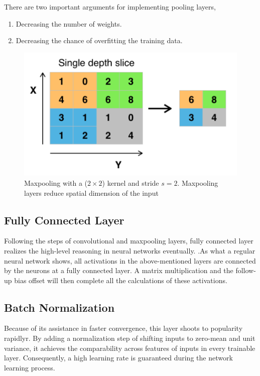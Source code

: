     There are two important arguments for implementing pooling layers,
    \begin{enumerate}
        \item Decreasing the number of weights.
        \item Decreasing the chance of overfitting the training data.
    \end{enumerate}
    \begin{figure}[!h]
        \centering
        \includegraphics[scale=0.5]{Figures/Max_pooling.pdf}
        \caption{Maxpooling with a ($2\times 2$) kernel and stride $s=2$. Maxpooling layers reduce spatial dimension of the input \cite{li2015convolutional}}
        \label{maxpooling}
    \end{figure}

    \subsection{Fully Connected Layer}
    Following the steps of convolutional and maxpooling layers, fully connected layer realizes the high-level reasoning in neural networks eventually. .As what a regular neural network shows, all activations in the above-mentioned layers are connected by the neurons at a fully connected layer. A matrix multiplication and the follow-up bias offset will then complete all the calculations of these activations.

    \subsection{Batch Normalization}
    \label{batchnor}
    Because of its assistance in faster convergence, this layer shoots to popularity rapidlyr\cite{ioffe2015batch}. By adding a normalization step of shifting inputs to zero-mean and unit variance, it achieves the comparability across features of inputs in every trainable layer. Consequently, a high learning rate is guaranteed during the network learning process. 

